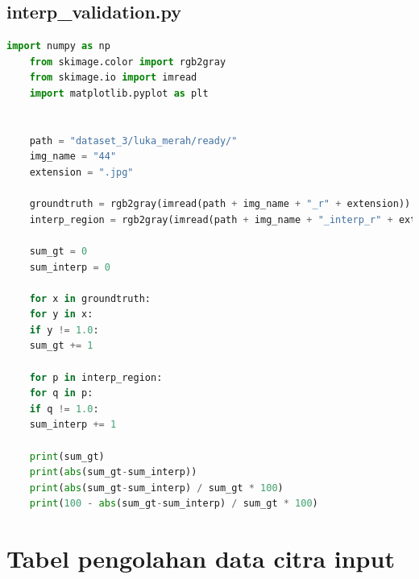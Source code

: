 \section{interp\_validation.py}
\begin{lstlisting}[language=Python, basicstyle=\tiny]
	import numpy as np
	from skimage.color import rgb2gray
	from skimage.io import imread
	import matplotlib.pyplot as plt
	
	
	path = "dataset_3/luka_merah/ready/"
	img_name = "44"
	extension = ".jpg"
	
	groundtruth = rgb2gray(imread(path + img_name + "_r" + extension))
	interp_region = rgb2gray(imread(path + img_name + "_interp_r" + extension))
	
	sum_gt = 0
	sum_interp = 0
	
	for x in groundtruth:
	for y in x:
	if y != 1.0:
	sum_gt += 1
	
	for p in interp_region:
	for q in p:
	if q != 1.0:
	sum_interp += 1
	
	print(sum_gt)
	print(abs(sum_gt-sum_interp))
	print(abs(sum_gt-sum_interp) / sum_gt * 100)
	print(100 - abs(sum_gt-sum_interp) / sum_gt * 100)
\end{lstlisting}

\chapter{Tabel pengolahan data citra input}

